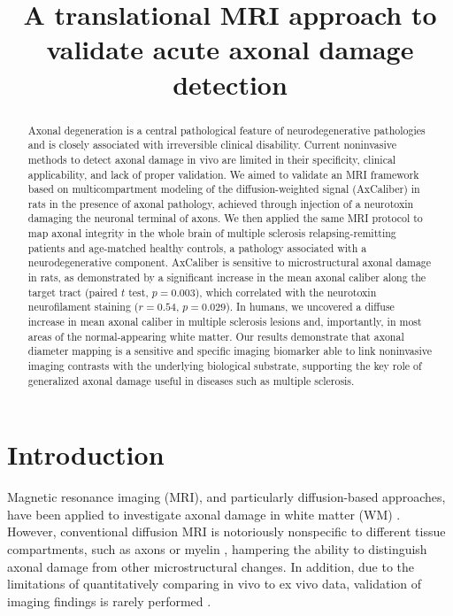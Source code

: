\documentclass[11pt]{article}
\title{A translational MRI approach to validate acute axonal damage detection}
\date{}
\begin{document}
\maketitle

\begin{abstract}
Axonal degeneration is a central pathological feature of neurodegenerative pathologies and is closely associated with irreversible clinical disability. Current noninvasive methods to detect axonal damage in vivo are limited in their specificity, clinical applicability, and lack of proper validation. We aimed to validate an MRI framework based on multicompartment modeling of the diffusion-weighted signal (AxCaliber) in rats in the presence of axonal pathology, achieved through injection of a neurotoxin damaging the neuronal terminal of axons. We then applied the same MRI protocol to map axonal integrity in the whole brain of multiple sclerosis relapsing-remitting patients and age-matched healthy controls, a pathology associated with a neurodegenerative component. AxCaliber is sensitive to microstructural axonal damage in rats, as demonstrated by a significant increase in the mean axonal caliber along the target tract (paired $t$ test, $p=0.003$), which correlated with the neurotoxin neurofilament staining ($r=0.54$, $p=0.029$). In humans, we uncovered a diffuse increase in mean axonal caliber in multiple sclerosis lesions and, importantly, in most areas of the normal-appearing white matter. Our results demonstrate that axonal diameter mapping is a sensitive and specific imaging biomarker able to link noninvasive imaging contrasts with the underlying biological substrate, supporting the key role of generalized axonal damage useful in diseases such as multiple sclerosis.
\end{abstract}

\section{Introduction}
Magnetic resonance imaging (MRI), and particularly diffusion-based approaches, have been applied to investigate axonal damage in white matter (WM) \cite{Inglese2010}. However, conventional diffusion MRI is notoriously nonspecific to different tissue compartments, such as axons or myelin \cite{DeSantis2014}, hampering the ability to distinguish axonal damage from other microstructural changes. In addition, due to the limitations of quantitatively comparing in vivo to ex vivo data, validation of imaging findings is rarely performed \cite{Horowitz2015b}.
\end{document}
